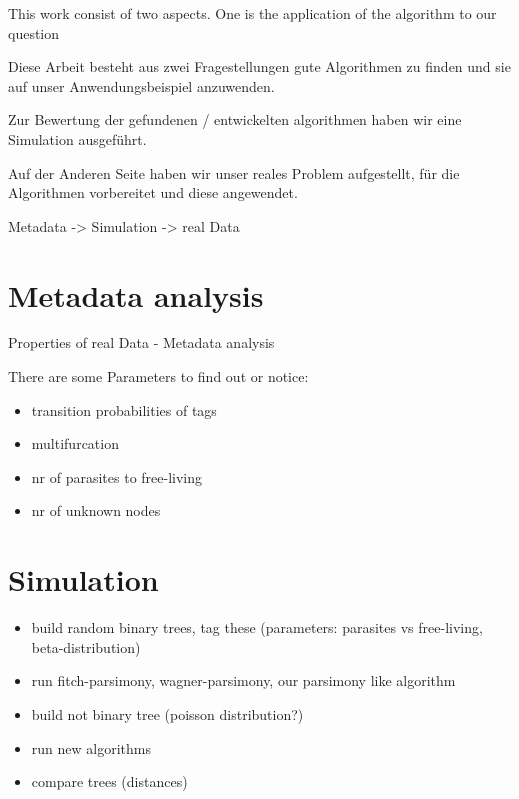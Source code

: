   This work consist of two aspects. One is the application of the algorithm to our question

  Diese Arbeit besteht aus zwei Fragestellungen
  gute Algorithmen zu finden und sie auf unser Anwendungsbeispiel anzuwenden.

  Zur Bewertung der gefundenen / entwickelten algorithmen haben wir eine Simulation ausgeführt.

  Auf der Anderen Seite haben wir unser reales Problem aufgestellt, für die Algorithmen vorbereitet und 
  diese angewendet.
  

  Metadata -> Simulation ->  real Data

  \section{Metadata analysis}
    Properties of real Data - Metadata analysis

    There are some Parameters to find out or notice:
    \begin{itemize}
      \item transition probabilities of tags
      \item multifurcation
      \item nr of parasites to free-living
      \item nr of unknown nodes 
    \end{itemize}

  \section{Simulation}
    \begin{itemize}
      \item build random binary trees, tag these (parameters: parasites vs free-living, 
        beta-distribution)
      \item run fitch-parsimony, wagner-parsimony, our parsimony like algorithm
      \item build not binary tree (poisson distribution?)
      \item run new algorithms
      \item compare trees (distances)
    \end{itemize}

